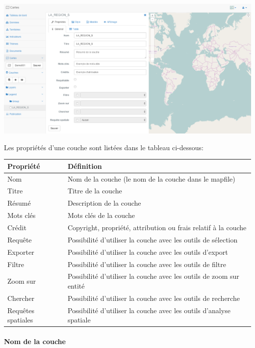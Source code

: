 \documentclass[letterpaper,10pt,french]{sphinxmanual}
\begin{document}
\includegraphics[width=1.000\linewidth]{set-layer-properties-window.png}

Les propriétés d'une couche sont listées dans le tableau ci-dessous:

\begin{tabulary}{\linewidth}{|L|L|}
\hline

\textbf{Propriété}
 & 
\textbf{Définition}
\\
\hline
Nom
 & 
Nom de la couche (le nom de la couche dans le mapfile)
\\
\hline
Titre
 & 
Titre de la couche
\\
\hline
Résumé
 & 
Description de la couche
\\
\hline
Mots clés
 & 
Mots clés de la couche
\\
\hline
Crédit
 & 
Copyright, propriété, attribution ou frais relatif à la couche
\\
\hline
Requête
 & 
Possibilité d'utiliser la couche avec les outils de sélection
\\
\hline
Exporter
 & 
Possibilité d'utiliser la couche avec les outils d'export
\\
\hline
Filtre
 & 
Possibilité d'utiliser la couche avec les outils de filtre
\\
\hline
Zoom sur
 & 
Possibilité d'utiliser la couche avec les outils de zoom sur entité
\\
\hline
Chercher
 & 
Possibilité d'utiliser la couche avec les outils de recherche
\\
\hline
Requêtes spatiales
 & 
Possibilité d'utiliser la couche avec les outils d'analyse spatiale
\\
\hline\end{tabulary}

\paragraph{Nom de la couche}
\end{document}
